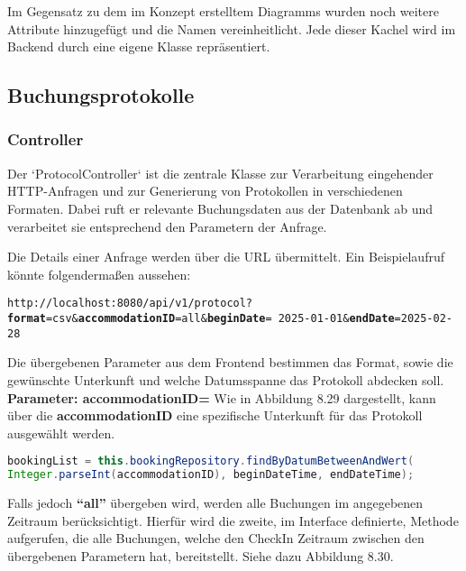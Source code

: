 	\noindent Im Gegensatz zu dem im Konzept erstelltem Diagramms wurden noch weitere Attribute hinzugefügt und die Namen vereinheitlicht. Jede dieser Kachel wird im Backend durch eine eigene Klasse repräsentiert. 
	
	
	
	\subsection{Buchungsprotokolle}
	\subsubsection{Controller}
	\noindent Der `ProtocolController` ist die zentrale Klasse zur Verarbeitung eingehender HTTP-Anfragen und zur Generierung von Protokollen in verschiedenen Formaten. Dabei ruft er relevante Buchungsdaten aus der Datenbank ab und verarbeitet sie entsprechend den Parametern der Anfrage.  
	
	\noindent Die Details einer Anfrage werden über die URL übermittelt. Ein Beispielaufruf könnte folgendermaßen aussehen:  
	
	\begin{center}
		\texttt{http://localhost:8080/api/v1/protocol?\textbf{format}=csv\&\textbf{accommodationID}=all\&\textbf{beginDate}=
			2025-01-01\&\textbf{endDate}=2025-02-28}
	\end{center}
	
	\noindent Die übergebenen Parameter aus dem Frontend bestimmen das Format, sowie die gewünschte Unterkunft und welche Datumsspanne das Protokoll abdecken soll.  
	\newpage
	\noindent \textbf{Parameter: accommodationID=} \vspace{3mm}\newline 
	\noindent Wie in Abbildung 8.29 dargestellt, kann über die \textbf{accommodationID} eine spezifische Unterkunft für das Protokoll ausgewählt werden.
	
\begin{lstlisting}[language=Java, caption={Code-Ausschnitt: Buchungen Laden mit Unterkunft.}]
bookingList = this.bookingRepository.findByDatumBetweenAndWert(
Integer.parseInt(accommodationID), beginDateTime, endDateTime);
\end{lstlisting}
	
	\noindent Falls jedoch \textbf{\enquote{all}} übergeben wird, werden alle Buchungen im angegebenen Zeitraum berücksichtigt. Hierfür wird die zweite, im Interface definierte, Methode aufgerufen, die alle Buchungen, welche den CheckIn Zeitraum zwischen den übergebenen Parametern hat, bereitstellt. Siehe dazu Abbildung 8.30.
	
